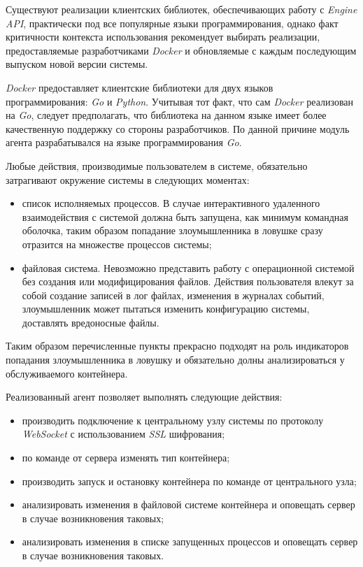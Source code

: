 Существуют реализации клиентских библиотек, обеспечивающих работу с \textit{Engine API}, практически под все популярные языки программирования, однако факт критичности контекста использования рекомендует выбирать реализации, предоставляемые разработчиками \textit{Docker} и обновляемые с каждым последующим выпуском новой версии системы.

\textit{Docker} предоставляет клиентские библиотеки для двух языков программирования: \textit{Go} и \textit{Python}. Учитывая тот факт, что сам \textit{Docker} реализован на \textit{Go}, следует предполагать, что библиотека на данном языке имеет более качественную поддержку со стороны разработчиков. По данной причине модуль агента разрабатывался на языке программирования \textit{Go}.

Любые действия, производимые пользователем в системе, обязательно затрагивают окружение системы в следующих моментах:
\begin{itemize}
	\item список исполняемых процессов. В случае интерактивного удаленного взаимодействия с системой должна быть запущена, как минимум командная оболочка, таким образом попадание злоумышленника в ловушке сразу отразится на множестве процессов системы;
	\item файловая система. Невозможно представить работу с операционной системой без создания или модифицирования файлов. Действия пользователя влекут за собой создание записей в лог файлах, изменения в журналах событий, злоумышленник может пытаться изменить конфигурацию системы, доставлять вредоносные файлы.
\end{itemize}

Таким образом перечисленные пункты прекрасно подходят на роль индикаторов попадания злоумышленника в ловушку и обязательно долны анализироваться у обслуживаемого контейнера.

Реализованный агент позволяет выполнять следующие действия:
\begin{itemize}
\item производить подключение к центральному узлу системы по протоколу \textit{WebSocket} с использованием \textit{SSL} шифрования;
\item по команде от сервера изменять тип контейнера;
\item производить запуск и остановку контейнера по команде от центрального узла;
\item анализировать изменения в файловой системе контейнера и оповещать сервер в случае возникновения таковых;
\item анализировать изменения в списке запущенных процессов и оповещать сервер в случае возникновения таковых.
\end{itemize}

